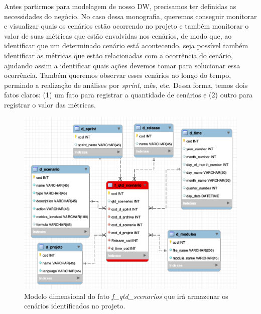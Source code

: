 %
Antes partirmos para modelagem de nosso DW,  precisamos ter definidas as necessidades do negócio. No caso dessa monografia, queremos conseguir monitorar e visualizar quais os cenários estão ocorrendo no projeto e também monitorar o valor de suas métricas que estão envolvidas nos cenários, de modo que, ao identificar que um determinado cenário está acontecendo, seja possível também identificar as métricas que estão relacionadas com a ocorrência do cenário, ajudando assim a identificar quais ações devemos tomar para solucionar essa ocorrência. Também queremos observar esses cenários ao longo do tempo, permindo a realização de análises por \emph{sprint}, mês, etc. Dessa forma, temos dois fatos claros: (1) um fato para registrar a quantidade de cenários e (2) outro para registrar o valor das métricas.

 \begin{figure}[H]
 	\centering
 		\includegraphics[scale=0.5]{figuras/dw-f-scenarios}
 		\caption{Modelo dimensional do fato \emph{f\_qtd\_scenarios} que irá armazenar os cenários identificados no projeto.}
 		\label{dw-model1}
 \end{figure}

 


